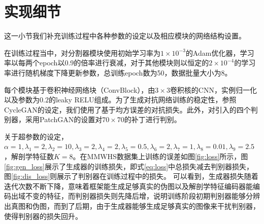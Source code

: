 \section{实现细节}
这一小节我们补充训练过程中各种参数的设定以及相应模块的网络结构设置。

在训练过程当中，对分割器模块使用初始学习率为$1\times 10^{-3}$的Adam优化器，学习率以每两个epoch以0.9的倍率进行衰减，对于其他模块则以恒定的$2\times 10^{-4}$的学习率进行随机梯度下降更新参数，总训练epoch数为50，数据批量大小为8。

每个模块基于卷积神经网络块（ConvBlock），由$3\times 3$卷积核的CNN，实例归一化以及参数为$0.2$的leaky RELU组成。为了生成对抗网络训练的稳定性，参照CycleGAN的设定，我们使用了基于均方误差的对抗损失。此外，对引入的四个判别器，采用PatchGAN\cite{isola2017image}的设置对$70\times 70$的补丁进行判别。

关于超参数的设定，$\alpha=1, \lambda_1=2, \lambda_2=10, \lambda_3=2, \lambda_4=2, \lambda_5=0.5, \lambda_6=2, \lambda_7=1, \lambda_8=0.01, \lambda_9=2.5$，解剖学特征数$K=8$。在MMWHS数据集上训练的误差如图\ref{fig:loss}所示，图\ref{fig:gen_loss}展示了生成器的训练损失，即式\ref{eq:loss}中总损失减去判别器损失，图\ref{fig:dis_loss}则展示了判别器在训练过程中的损失。
可以看到，生成器损失随着迭代次数不断下降，意味着框架能生成足够真实的伪图以及解剖学特征编码器能编码出域不变的特征，而判别器损失则先降后增，说明训练阶段初期判别器能够分辨出真图和伪图，而到了后期，由于生成器能够生成足够真实的图像来干扰判别器，使得判别器的损失回升。


